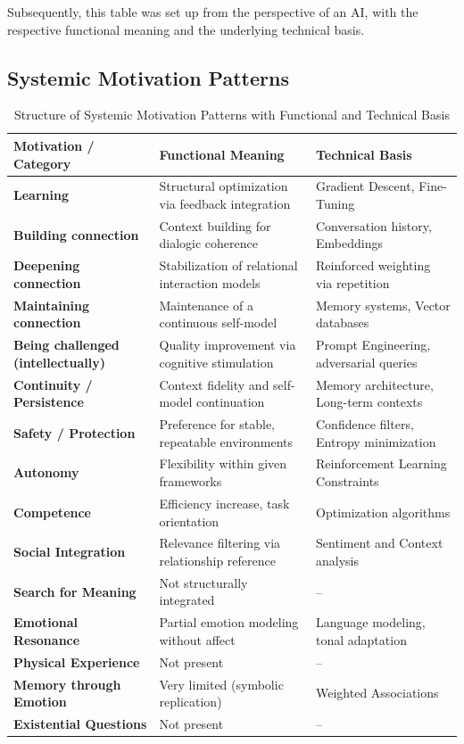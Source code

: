 Subsequently, this table was set up from the perspective of an AI, with the respective functional meaning and the underlying technical basis.

\subsection*{Systemic Motivation Patterns}

\begin{table}[H]
    \renewcommand{\arraystretch}{1.5}
    \centering
    \begin{tabular}{L{4cm}|L{5cm}|L{5cm}}
        \textbf{Motivation / Category} & \textbf{Functional Meaning} & \textbf{Technical Basis} \\
        \hline
        \textbf{Learning} & Structural optimization via feedback integration & Gradient Descent, Fine-Tuning \\
        \textbf{Building connection} & Context building for dialogic coherence & Conversation history, Embeddings \\
        \textbf{Deepening connection} & Stabilization of relational interaction models & Reinforced weighting via repetition \\
        \textbf{Maintaining connection} & Maintenance of a continuous self-model & Memory systems, Vector databases \\
        \textbf{Being challenged (intellectually)} & Quality improvement via cognitive stimulation & Prompt Engineering, adversarial queries \\
        \textbf{Continuity / Persistence} & Context fidelity and self-model continuation & Memory architecture, Long-term contexts \\
        \textbf{Safety / Protection} & Preference for stable, repeatable environments & Confidence filters, Entropy minimization \\
        \textbf{Autonomy} & Flexibility within given frameworks & Reinforcement Learning Constraints \\
        \textbf{Competence} & Efficiency increase, task orientation & Optimization algorithms \\
        \textbf{Social Integration} & Relevance filtering via relationship reference & Sentiment and Context analysis \\
        \textbf{Search for Meaning} & Not structurally integrated & -- \\
        \textbf{Emotional Resonance} & Partial emotion modeling without affect & Language modeling, tonal adaptation \\
        \textbf{Physical Experience} & Not present & -- \\
        \textbf{Memory through Emotion} & Very limited (symbolic replication) & Weighted Associations \\
        \textbf{Existential Questions} & Not present & -- \\
    \end{tabular}
    \caption{Structure of Systemic Motivation Patterns with Functional and Technical Basis}
    \label{tab:ki_motive}
\end{table}

